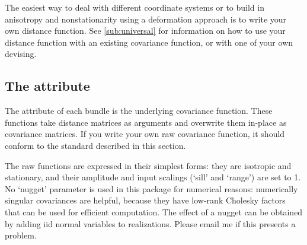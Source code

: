 \documentclass{manual}
\begin{document}
The easiest way to deal with different coordinate systems or to build in anisotropy and nonstationarity using a deformation approach \cite{sampson} is to write your own distance function. See \ref{sub:universal} for information on how to use your distance function with an existing covariance function, or with one of your own devising. 

\subsection{The  attribute}\label{sub:raw}
The  attribute of each bundle is the underlying covariance function. These functions take distance matrices as arguments and overwrite them in-place as covariance matrices. If you write your own raw covariance function, it should conform to the standard described in this section.

The raw functions are expressed in their simplest forms: they are isotropic and stationary, and their amplitude and input scalings (`sill' and `range') are set to 1. No `nugget' parameter is used in this package for numerical reasons: numerically singular covariances are helpful, because they have low-rank Cholesky factors that can be used for efficient computation. The effect of a nugget can be obtained by adding iid normal variables to realizations. Please email me if this presents a problem.
\end{document}
